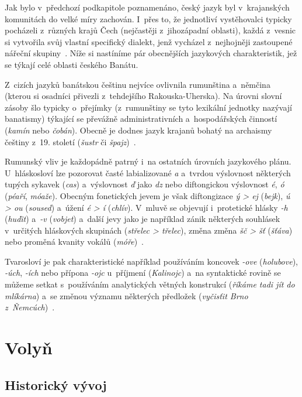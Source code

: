 Jak bylo v~předchozí podkapitole poznamenáno, český jazyk byl v~krajanských komunitách do velké míry zachován. I~přes to, že jednotliví vystěhovalci typicky pocházeli z~různých krajů Čech (nejčastěji z~jihozápadní oblasti), každá z~vesnic si vytvořila svůj vlastní specifický dialekt, jenž vycházel z~nejhojněji zastoupené nářeční skupiny~\parencite{Gecse2013}. Níže si nastíníme pár obecnějších jazykových charakteristik, jež se týkají celé oblasti českého Banátu.

Z~cizích jazyků banátskou češtinu nejvíce ovlivnila rumunština a~němčina (kterou si osadníci přivezli z~tehdejšího Rakouska-Uherska). Na úrovni slovní zásoby šlo typicky o~přejímky (z~rumunštiny se tyto lexikální jednotky nazývají banatismy) týkající se převážně administrativních a~hospodářských činností (\emph{kamín} nebo \emph{čobán}). Obecně je dodnes jazyk krajanů bohatý na archaismy češtiny z~19. století (\emph{šustr} či \emph{špajz})~\parencite{Frnochova2012}.

Rumunský vliv je každopádně patrný i~na ostatních úrovních jazykového plánu. U~hláskosloví lze pozorovat časté labializované \emph{a} a~tvrdou výslovnost některých tupých sykavek (\emph{cas}) a~výslovnost \emph{ď }jako \emph{dz} nebo diftongickou výslovnost \emph{é}, \emph{ó} (\emph{péaří}, \emph{móaže}). Obecným fonetických jevem je však diftongizace \emph{ý \textgreater{} ej} (\emph{bejk}), \emph{ú \textgreater{} ou} (\emph{soused}) a~úžení \emph{é \textgreater{} í} (\emph{chlív}). V~mluvě se objevují i~protetické hlásky \emph{-h} (\emph{huďit}) a~\emph{-v} (\emph{vobjet}) a~další jevy jako je například zánik některých souhlásek v~určitých hláskových skupinách (\emph{střelec \textgreater{} třelec}), změna změna \emph{šč \textgreater{} šť} (\emph{šťáva}) nebo proměná kvanity vokálů (\emph{móře})~\parencite{Skulina1976}.

Tvarosloví je pak charakteristické například používáním koncovek \emph{-ove} (\emph{holubove}), \emph{-úch}, \emph{-ích} nebo přípona \emph{-ojc} u~příjmení (\emph{Kalinojc}) a~na syntaktické rovině se můžeme setkat s~používáním analytických větných konstrukcí (\emph{říkáme tadi jít do mlíkárna}) a~se změnou významu některých předložek (\emph{vyčisťit Brno z~Ňemcúch})~\parencite{Skulina1976}.

\hypertarget{volyux148}{%
\section{Volyň}\label{volyux148}}

\hypertarget{historickuxfd-vuxfdvoj-1}{%
\subsection*{Historický vývoj}\label{historickuxfd-vuxfdvoj-1}}


